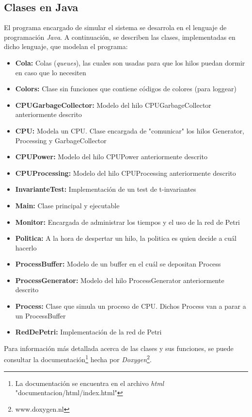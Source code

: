 \documentclass{article}
\begin{document}
    \subsection{Clases en Java}
    \begin{flushleft}
        El programa encargado de simular el sistema se desarrola en el lenguaje de programación
        \emph{Java}. A continuación, se describen las clases, implementadas en dicho lenguaje,
        que modelan el programa:
        \begin{itemize}
            \item \textbf{Cola:} Colas (\emph{queues}), las cuales son usadas para que los
            hilos puedan dormir en caso que lo necesiten
            \item \textbf{Colors:} Clase sin funciones que contiene códigos de colores (para 
            loggear)
            \item \textbf{CPUGarbageCollector:} Modelo del hilo CPUGarbageCollector anteriormente
            descrito
            \item \textbf{CPU:} Modela un CPU. Clase encargada de "comunicar" los hilos Generator,
            Processing y GarbageCollector
            \item \textbf{CPUPower:} Modelo del hilo CPUPower anteriormente descrito
            \item \textbf{CPUProcessing:} Modelo del hilo CPUProcessing anteriormente descrito
            \item \textbf{InvarianteTest:} Implementación de un test de t-invariantes
            \item \textbf{Main:} Clase principal y ejecutable
            \item \textbf{Monitor:} Encargada de administrar los tiempos y el uso de la red de 
            Petri
            \item \textbf{Politica:} A la hora de despertar un hilo, la politica es quien decide
            a cuál hacerlo
            \item \textbf{ProcessBuffer:} Modelo de un buffer en el cuál se depositan Process
            \item \textbf{ProcessGenerator:} Modelo del hilo ProcessGenerator anteriormente
            descrito
            \item \textbf{Process:} Clase que simula un proceso de CPU. Dichos Process van a
            parar a un ProcessBuffer
            \item \textbf{RedDePetri:} Implementación de la red de Petri
        \end{itemize}
        Para información más detallada acerca de las clases y sus funciones, se puede consultar
        la documentación\footnote{La documentación se encuentra en el archivo \emph{html}
        "documentacion/html/index.html"} hecha por \emph{Doxygen}\footnote{www.doxygen.nl}.
    \end{flushleft}
\end{document}
